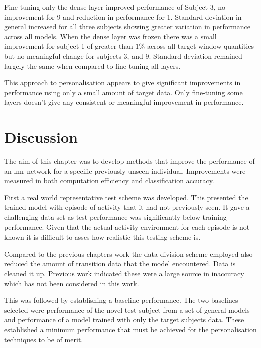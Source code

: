 Fine-tuning only the dense layer improved performance of Subject 3, no improvement for 9 and reduction in performance for 1. Standard deviation in general increased for all three subjects showing greater variation in performance across all models. When the dense layer was frozen there was a small improvement for subject 1 of greater than $1\%$ across all target window quantities but no meaningful change for subjects 3, and 9. Standard deviation remained largely the same when compared to fine-tuning all layers.

This approach to personalisation appears to give significant improvements in performance using only a small amount of target data. Only fine-tuning some layers doesn't give any consistent or meaningful improvement in performance.

\section{Discussion}
\label{sec:personalisation-discussion}
The aim of this chapter was to develop methods that improve the performance of an \acrshort{lmr} network for a specific previously unseen individual. Improvements were measured in both computation efficiency and classification accuracy.

First a real world representative test scheme was developed. This presented the trained model with episode of activity that it had not previously seen. It gave a challenging data set as test performance was significantly below training performance. Given that the actual activity environment for each episode is not known it is difficult to asses how realistic this testing scheme is. 

Compared to the previous chapters work the data division scheme employed also reduced the amount of transition data that the model encountered. Data is cleaned it up. Previous work indicated these were a large source in inaccuracy which has not been considered in this work.

This was followed by establishing a baseline performance. The two baselines selected were performance of the novel test subject from a set of general models and performance of a model trained with only the target subjects data. These established a minimum performance that must be achieved for the personalisation techniques to be of merit.

